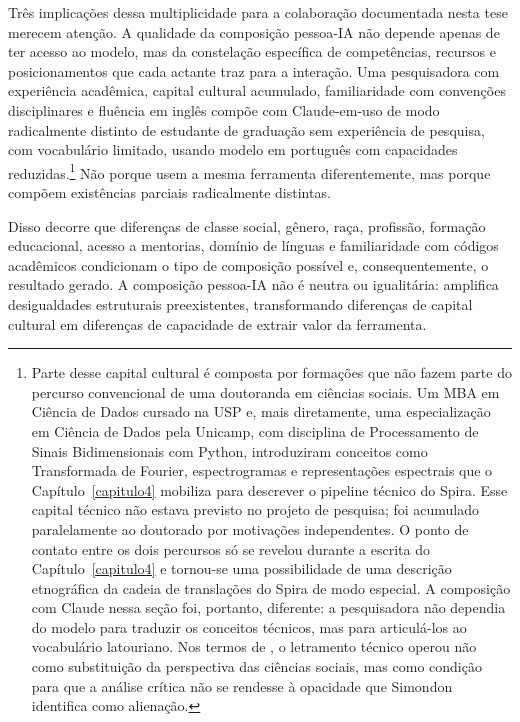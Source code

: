 Três implicações dessa multiplicidade para a colaboração documentada nesta tese merecem atenção. A qualidade da composição pessoa-IA não depende apenas de ter acesso ao modelo, mas da constelação específica de competências, recursos e posicionamentos que cada actante traz para a interação. Uma pesquisadora com experiência acadêmica, capital cultural acumulado, familiaridade com convenções disciplinares e fluência em inglês compõe com Claude-em-uso de modo radicalmente distinto de estudante de graduação sem experiência de pesquisa, com vocabulário limitado, usando modelo em português com capacidades reduzidas.\footnote{Parte desse capital cultural é composta por formações que não fazem parte do percurso convencional de uma doutoranda em ciências sociais. Um MBA em Ciência de Dados cursado na USP e, mais diretamente, uma especialização em Ciência de Dados pela Unicamp, com disciplina de Processamento de Sinais Bidimensionais com Python, introduziram conceitos como Transformada de Fourier, espectrogramas e representações espectrais que o Capítulo~\ref{capitulo4} mobiliza para descrever o pipeline técnico do Spira. Esse capital técnico não estava previsto no projeto de pesquisa; foi acumulado paralelamente ao doutorado por motivações independentes. O ponto de contato entre os dois percursos só se revelou durante a escrita do Capítulo~\ref{capitulo4} e tornou-se uma possibilidade de uma descrição etnográfica da cadeia de translações do Spira de modo especial. A composição com Claude nessa seção foi, portanto, diferente: a pesquisadora não dependia do modelo para traduzir os conceitos técnicos, mas para articulá-los ao vocabulário latouriano. Nos termos de \textcite{Vicentin_2022_Esboco}, o letramento técnico operou não como substituição da perspectiva das ciências sociais, mas como condição para que a análise crítica não se rendesse à opacidade que Simondon identifica como alienação.} Não porque usem a mesma ferramenta diferentemente, mas porque compõem existências parciais radicalmente distintas.

Disso decorre que diferenças de classe social, gênero, raça, profissão, formação educacional, acesso a mentorias, domínio de línguas e familiaridade com códigos acadêmicos condicionam o tipo de composição possível e, consequentemente, o resultado gerado. A composição pessoa-IA não é neutra ou igualitária: amplifica desigualdades estruturais preexistentes, transformando diferenças de capital cultural em diferenças de capacidade de extrair valor da ferramenta.

